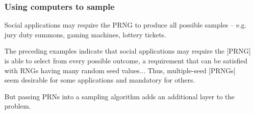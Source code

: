 \documentclass{beamer}
\newcommand{\todo}[1]{{\color{red}{TO DO: \sc #1}}}
\begin{document}
\begin{frame}
\frametitle{Using computers to sample}

Social applications may require the PRNG to produce all possible samples -- e.g. jury duty summons, gaming machines, lottery tickets.

\vspace{10pt}
\begin{block}{\cite{marsaglia_seeds_2003}}
The preceding examples indicate that social applications may require the [PRNG] is able to select from every possible outcome, a requirement that can be satisfied with RNGs having many random seed values... Thus, multiple-seed [PRNGs] seem desirable for some applications and mandatory for others.
\end{block}

\vspace{10pt}
But passing PRNs into a sampling algorithm adds an additional layer to the problem.

\end{frame}

\end{document}
